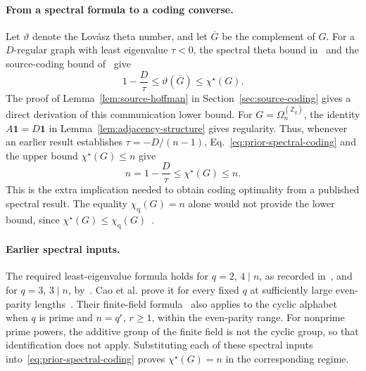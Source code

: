 \documentclass[11pt,a4paper]{article}
\numberwithin{equation}{section}
\numberwithin{figure}{section}
\numberwithin{table}{section}
\numberwithin{footnote}{section}
\theoremstyle{informal}\newtheorem*{informaltheorem}{Informal theorem}
\theoremstyle{definition}\newtheorem{example}{Example}[section]
\theoremstyle{remark}\newtheorem{remark}[theorem]{Remark}
\newcommand{\Z}{\mathbb Z}
\newcommand{\one}{\mathbf 1}
\newcommand{\chq}{\chi_{\mathrm q}}
\newcommand{\chs}{\chi^{\star}}
\newcommand{\Om}{\Omega_n^{(\Z_q)}}
\begin{document}
\paragraph{From a spectral formula to a coding converse.}
Let \(\vartheta\) denote the Lov\'asz theta number, and let
\(\overline G\) be the complement of \(G\). For a \(D\)-regular
graph with least eigenvalue \(\tau<0\), the spectral theta bound
in~\cite[Sec.~2.1]{bdov} and the source-coding bound
of~\cite[Theorem~2.1]{bblps} give
\begin{equation}\label{eq:prior-spectral-coding}
 1-\frac D\tau\leq\vartheta(\overline G)\leq\chs(G).
\end{equation}
The proof of Lemma~\ref{lem:source-hoffman} in
Section~\ref{sec:source-coding} gives a direct derivation of this
communication lower bound. For \(G=\Om\), the identity
\(A\one=D\one\) in Lemma~\ref{lem:adjacency-structure} gives regularity.
Thus, whenever an earlier result establishes \(\tau=-D/(n-1)\),
Eq.~\eqref{eq:prior-spectral-coding} and the upper bound
\(\chs(G)\leq n\) give
\begin{equation}
 n=1-\frac D\tau\leq\chs(G)\leq n.
\end{equation}
This is the extra implication needed to obtain coding optimality
from a published spectral result. The equality \(\chq(G)=n\)
alone would not provide the lower bound, since
\(\chs(G)\leq\chq(G)\)~\cite[Sec.~2.1]{bblps}.

\paragraph{Earlier spectral inputs.}
The required least-eigenvalue formula holds for \(q=2\),
\(4\mid n\), as recorded in~\cite[Sec.~3.2]{wed}, and for
\(q=3\), \(3\mid n\), by~\cite[Theorem~2]{lnz}.
Cao et al. prove it for every fixed \(q\) at sufficiently large
even-parity lengths~\cite[Lemma~4.4]{cao}. Their finite-field
formula~\cite[Lemma~4.6]{cao} also applies to the cyclic alphabet
when \(q\) is prime and \(n=q^r\), \(r\geq1\), within the
even-parity range. For nonprime prime powers, the additive group of
the finite field is not the cyclic group, so that identification
does not apply. Substituting each of these spectral inputs
into~\eqref{eq:prior-spectral-coding} proves \(\chs(G)=n\)
in the corresponding regime.
\end{document}
